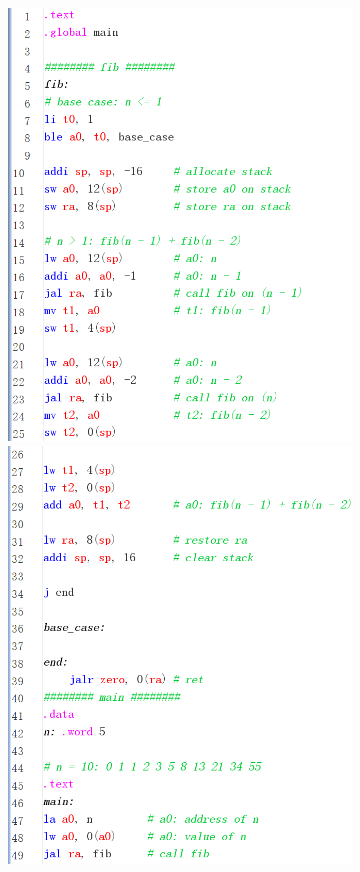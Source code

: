 \begin{figure}[h]
\begin{subfigure}[c]{0.46\textwidth}
	\end{subfigure}
	\hfill
	\begin{subfigure}[c]{0.46\textwidth}
			\centering
			\includegraphics[width = 1.00\textwidth]{figs/fib-rec-25.png}
			\includegraphics[width = 1.00\textwidth]{figs/fib-rec-49.png}

\end{subfigure}
\end{figure}
